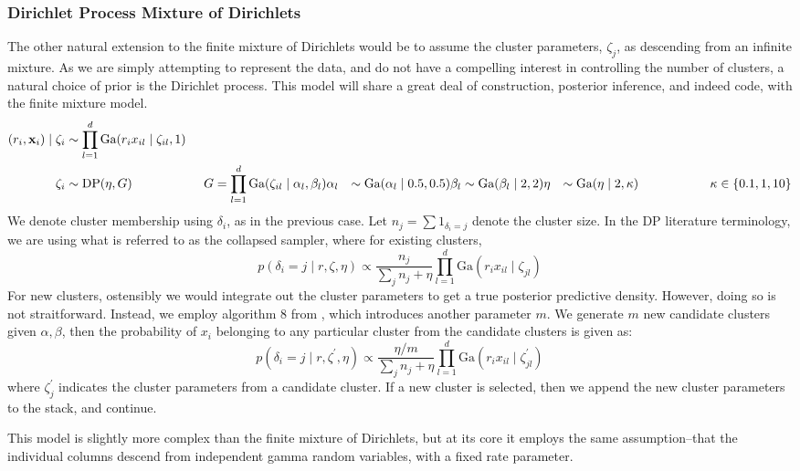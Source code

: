 \subsubsection{Dirichlet Process Mixture of Dirichlets}
The other natural extension to the finite mixture of Dirichlets would be to assume the cluster
  parameters, $\zeta_j$, as descending from an infinite mixture.  As we are simply attempting to
  represent the data, and do not have a compelling interest in controlling the number of clusters,
  a natural choice of prior is the Dirichlet process.  This model will share a great deal of
  construction, posterior inference, and indeed code, with the finite mixture model.
  \begin{equation}
    \label{eq:dpsimplex}
    \begin{aligned}
      (r_i, {\bf x}_i) \mid \zeta_i &\sim \prod_{l = 1}^d\text{Ga}(r_ix_{il}\mid \zeta_{il}, 1)\\
      \zeta_i &\sim \text{DP}(\eta, G)\hspace{2cm}G = \prod_{l = 1}^d \text{Ga}(\zeta_{il}\mid \alpha_l,\beta_l)
      \alpha_l &\sim \text{Ga}(\alpha_l \mid 0.5, 0.5)
      \beta_l &\sim \text{Ga}(\beta_l \mid 2, 2)
      \eta &\sim \text{Ga}(\eta \mid 2, \kappa) \hspace{2cm}\kappa \in \lbrace 0.1, 1, 10\rbrace
    \end{aligned}
  \end{equation}
We denote cluster membership using $\delta_i$, as in the previous case.  Let
  $n_j = \sum 1_{\delta_i = j}$ denote the cluster size.  In the DP literature terminology, we
  are using what is referred to as the collapsed sampler, where for existing clusters,
  \begin{equation}
    p(\delta_i = j \mid r, \zeta, \eta) \propto \frac{n_j}{\sum_j n_j + \eta}
                \prod_{l = 1}^d\text{Ga}(r_ix_{il}\mid\zeta_{jl})
  \end{equation}
  For new clusters, ostensibly we would integrate out the cluster parameters to get a true
  posterior predictive density.  However, doing so is not straitforward.  Instead, we employ
  algorithm 8 from \cite{neal2000}, which introduces another parameter $m$.  We generate $m$ new
  candidate clusters given $\alpha,\beta$, then the probability of $x_i$ belonging to any
  particular cluster from the candidate clusters is given as:
  \begin{equation}
    p(\delta_i = j \mid r, \zeta^{\prime}, \eta) \propto \frac{\eta / m}{\sum_j n_j + \eta}
                \prod_{l = 1}^d\text{Ga}(r_ix_{il}\mid\zeta_{jl}^{\prime})
  \end{equation}
  where $\zeta_j^{\prime}$ indicates the cluster parameters from a candidate cluster.  If a new
  cluster is selected, then we append the new cluster parameters to the stack, and continue.

This model is slightly more complex than the finite mixture of Dirichlets, but at its core it
  employs the same assumption--that the individual columns descend from independent gamma random
  variables, with a fixed rate parameter.







